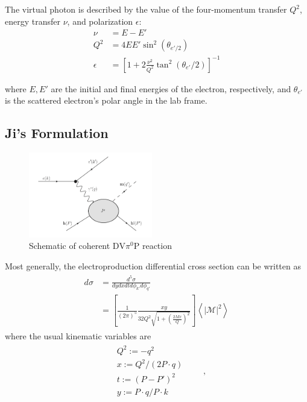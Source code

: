 \documentclass[10pt,prd,aps,showpacs,twocolumn,unsortedaddress]{revtex4-1}
\newcommand\pio{{\pi^0}}
\newcommand\dvmp{{\text{DV}\pio\text{P}}}
\newcommand\lr[1]{\left( #1\right) }
\newcommand\lrb[1]{\left[ #1\right] }
\newcommand\lra[1]{\left< #1\right> }
\newcommand\abv[1]{\left|#1 \right|}
\begin{document}
The virtual photon is described by the value of the four-momentum transfer $Q^2$, energy transfer $\nu$, and polarization $\epsilon$:
\begin{align}
\nu      &= E - E' \\
Q^2      &= 4 E E' \sin^2\lr{\theta_{e'/2}} \\
\epsilon &= \lrb{ 1 + 2\frac{\nu^2}{Q^2}\tan^2\lr{\theta_{e'}/2}}^{-1}
\end{align}

where $E, E'$ are the initial and final energies of the electron, respectively, and $\theta_{e'}$ is the scattered electron's polar angle in the lab frame.


\subsection{Ji's Formulation  
\label{bsa}}
\begin{figure}[h!]
    \captionsetup{width=0.48\linewidth, format = hang}
    \includegraphics[width = 0.48\textwidth]{figs/theory/dvmp}
    \caption[]{Schematic of coherent $\dvmp$ reaction }
    \label{dvmp}
\end{figure}
  Most generally, the electroproduction differential cross section can be written as
  \begin{align}
    \begin{split}
    d\sigma &= \frac{d^5\sigma}{dydxdtd\phi_{k'}d\phi_{q'}} 
    \\
    &= \lrb{\frac1{\lr{2\pi}^5}\frac{xy}{32Q^2\sqrt{1+\lr{\frac{2Mx}{Q}}^2}}} \lra{ \abv{ \mathcal{M}}^2 } 
    \end{split}
  \label{eq:dsig}
  \end{align}
  where the usual kinematic variables are 
  \begin{align}
  \begin{split}
  &Q^2 := -q^2                   \\ 
  &x   :=  Q^2/\lr{2 P\cdot q}   \\ 
  &t   := \lr{P-P'}^2            \\ 
  &y   := P\cdot q/P\cdot k          
  \end{split}
  \label{eq:kin_vars}
   \quad\quad,
  \end{align}
\end{document}
